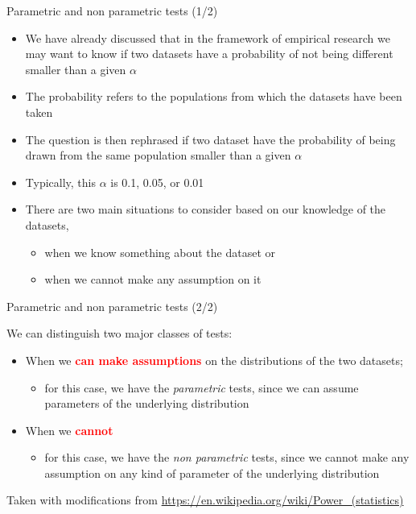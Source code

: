 \documentclass{beamer}
\begin{document}
\begin{frame}
{\centerline{Parametric and non parametric tests (1/2)}}

\begin{itemize}
    \item We have already discussed that in the framework of empirical research we may want to know if two datasets have a probability of not being different smaller than a given $\alpha$
    \item The probability refers to the populations from which the datasets have been taken
    \item The question is then rephrased if two dataset have the probability of being drawn from the same population smaller than a given $\alpha$
    \item Typically, this $\alpha$ is 0.1, 0.05, or 0.01
    \item There are two main situations to consider based on our knowledge of the datasets,
    \begin{itemize}
    \item when we know something about the dataset or
    \item when we cannot make any assumption on it
\end{itemize}
\end{itemize}

\end{frame}


\begin{frame}
{\centerline{Parametric and non parametric tests (2/2)}}

We can distinguish two major classes of tests:
\begin{itemize}
    \item When we \textcolor{red}{\bf can make assumptions} on the distributions of the two datasets;
    \begin{itemize}
    \item for this case, we have the \textit{parametric} tests, since we can assume parameters of the underlying distribution
    \end{itemize}
    \item When we \textcolor{red}{\bf cannot}
    \begin{itemize}
    \item for this case, we have the \textit{non parametric} tests, since we cannot make any assumption on any kind of parameter of the underlying distribution
\end{itemize}

\end{itemize}

\begin{center}
\tiny{Taken with modifications from \url{https://en.wikipedia.org/wiki/Power_(statistics)}}
\end{center}

\end{frame}
\end{document}
